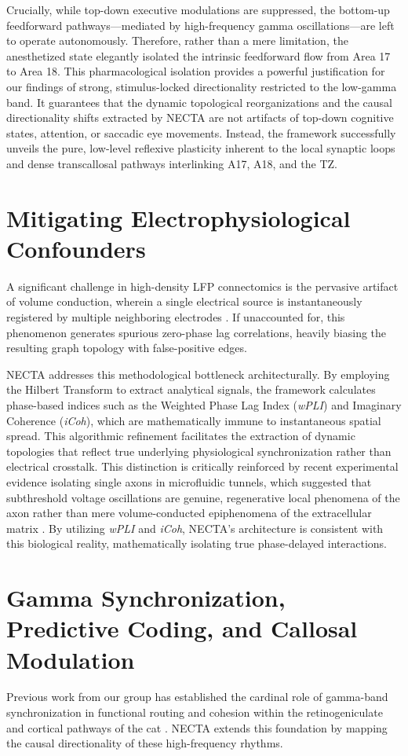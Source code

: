 Crucially, while top-down executive modulations are suppressed, the bottom-up feedforward pathways---mediated by high-frequency gamma oscillations---are left to operate autonomously. Therefore, rather than a mere limitation, the anesthetized state elegantly isolated the intrinsic feedforward flow from Area 17 to Area 18. This pharmacological isolation provides a powerful justification for our findings of strong, stimulus-locked directionality restricted to the low-gamma band. It guarantees that the dynamic topological reorganizations and the causal directionality shifts extracted by NECTA are not artifacts of top-down cognitive states, attention, or saccadic eye movements. Instead, the framework successfully unveils the pure, low-level reflexive plasticity inherent to the local synaptic loops and dense transcallosal pathways interlinking A17, A18, and the TZ.

\section{Mitigating Electrophysiological Confounders}
A significant challenge in high-density LFP connectomics is the pervasive artifact of volume conduction, wherein a single electrical source is instantaneously registered by multiple neighboring electrodes \cite{bastos2015}. If unaccounted for, this phenomenon generates spurious zero-phase lag correlations, heavily biasing the resulting graph topology with false-positive edges. 

NECTA addresses this methodological bottleneck architecturally. By employing the Hilbert Transform to extract analytical signals, the framework calculates phase-based indices such as the Weighted Phase Lag Index (\textit{wPLI}) and Imaginary Coherence (\textit{iCoh}), which are mathematically immune to instantaneous spatial spread. This algorithmic refinement facilitates the extraction of dynamic topologies that reflect true underlying physiological synchronization rather than electrical crosstalk. This distinction is critically reinforced by recent experimental evidence isolating single axons in microfluidic tunnels, which suggested that subthreshold voltage oscillations are genuine, regenerative local phenomena of the axon rather than mere volume-conducted epiphenomena of the extracellular matrix \cite{Lassers2026}. By utilizing \textit{wPLI} and \textit{iCoh}, NECTA's architecture is consistent with this biological reality, mathematically isolating true phase-delayed interactions.

\section{Gamma Synchronization, Predictive Coding, and Callosal Modulation}
Previous work from our group has established the cardinal role of gamma-band synchronization in functional routing and cohesion within the retinogeniculate and cortical pathways of the cat \cite{neuenschwander2023}. NECTA extends this foundation by mapping the causal directionality of these high-frequency rhythms. 

